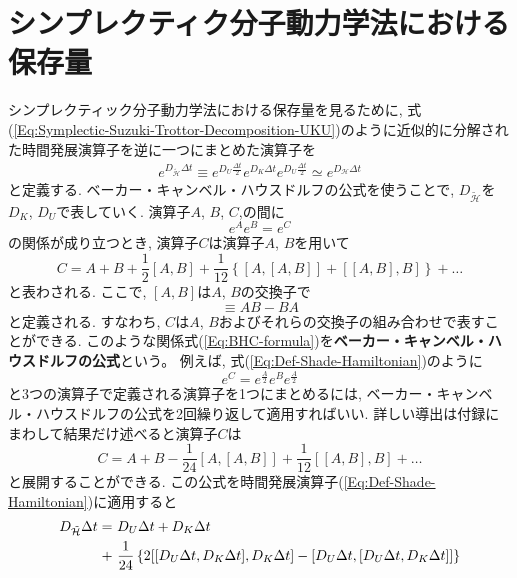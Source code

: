 \section{シンプレクティク分子動力学法における保存量}
シンプレクティック分子動力学法における保存量を見るために, 式(\ref{Eq:Symplectic-Suzuki-Trottor-Decomposition-UKU})のように近似的に分解された時間発展演算子を逆に一つにまとめた演算子を
\begin{align}
  e^{D_{\tilde{\mathcal{H}}} \Delta t}
  \equiv
  e^{D_{U} \frac{\Delta t}{2}}
  e^{D_{K} \Delta t}
  e^{D_{U} \frac{\Delta t}{2}}
  \simeq
  e^{D_{\mathcal{H}} \Delta t}
  \label{Eq:Def-Shade-Hamiltonian}
\end{align}
と定義する.
ベーカー・キャンベル・ハウスドルフの公式を使うことで, $D_{\tilde{\mathcal{H}}}$を$D_{K}$, $D_{U}$で表していく.
演算子$A$, $B$, $C$,の間に
\begin{equation}
  e^{A}e^{B} = e^{C}
\end{equation}
の関係が成り立つとき, 演算子$C$は演算子$A$, $B$を用いて
\begin{equation}
  C = A + B
    + \frac{1}{2} [A, B]
    + \frac{1}{12}
      \left\{
        [A, [A,B]] + [[A,B], B]
      \right\}
    + \ldots
  \label{Eq:BHC-formula}
\end{equation}
と表わされる. ここで, $[A, B]$は$A$, $B$の交換子で
\begin{equation}
  [A, B] \equiv AB - BA
\end{equation}
と定義される. すなわち, $C$は$A$, $B$およびそれらの交換子の組み合わせで表すことができる. 
このような関係式(\ref{Eq:BHC-formula})を\textbf{ベーカー・キャンベル・ハウスドルフの公式}という。
例えば, 式(\ref{Eq:Def-Shade-Hamiltonian})のように
\begin{equation}
  e^{C} = e^{\frac{A}{2}}e^{B}e^{\frac{A}{2}}
  \label{Eq:BHCformula-3operator}
\end{equation}
と3つの演算子で定義される演算子を1つにまとめるには, ベーカー・キャンベル・ハウスドルフの公式を2回繰り返して適用すればいい. 詳しい導出は付録にまわして結果だけ述べると演算子$C$は
\begin{equation}
  C = A + B
    - \frac{1}{24}[A, [A,B]]
    + \frac{1}{12}[[A,B], B]
    + \ldots
  \label{Eq:BHCformula-3operator-expansion}
\end{equation}
と展開することができる.
この公式を時間発展演算子(\ref{Eq:Def-Shade-Hamiltonian})に適用すると
\begin{align}
  D_{\Tilde{\mathcal{H}}} \Delta t
  =~&
  D_{U} \Delta t + D_{K} \Delta t
  \\ \notag
  +~&
  \frac{1}{24}
  \left\{
      2[[D_{U}\Delta t, D_{K}\Delta t], D_{K} \Delta t]
    -  [D_{U}\Delta t, [D_{U}\Delta t, D_{K}\Delta t]]
  \right\}
  \notag
\end{align}
